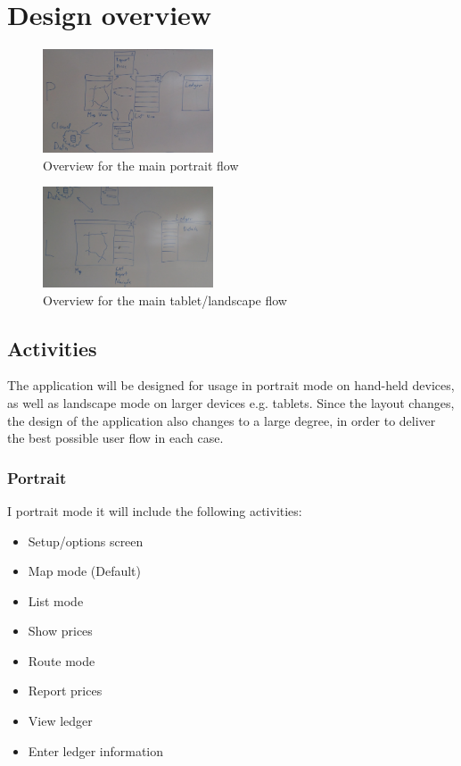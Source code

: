 
\chapter{Design overview}

\begin{figure}[!htb]
	\centering
	\includegraphics[width=0.45\textwidth]{P.jpg}
	\caption{Overview for the main portrait flow}
	\label{fig:p}
\end{figure}

\begin{figure}[!htb]
	\centering
	\includegraphics[width=0.45\textwidth]{L.jpg}
	\caption{Overview for the main tablet/landscape flow}
	\label{fig:l}
\end{figure}

\section{Activities}
The application will be designed for usage in portrait mode on hand-held devices, as well as landscape mode on larger devices e.g. tablets. Since the layout changes, the design of the application also changes to a large degree, in order to deliver the best possible user flow in each case.

\subsection{Portrait}
I portrait mode it will include the following activities:
\begin{itemize}
	\item Setup/options screen
	\item Map mode (Default)
	\item List mode
	\item Show prices
	\item Route mode
	\item Report prices
	\item View ledger
	\item Enter ledger information
\end{itemize}

